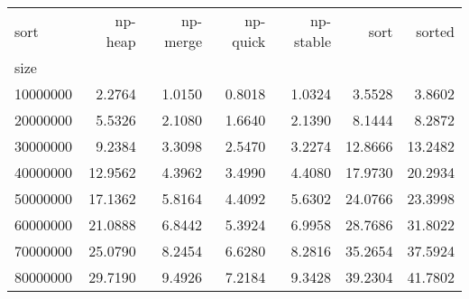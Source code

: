 \begin{tabular}{lrrrrrr}
\toprule
sort &  np-heap &  np-merge &  np-quick &  np-stable &     sort &   sorted \\
size     &          &           &           &            &          &          \\
\midrule
10000000 &   2.2764 &    1.0150 &    0.8018 &     1.0324 &   3.5528 &   3.8602 \\
20000000 &   5.5326 &    2.1080 &    1.6640 &     2.1390 &   8.1444 &   8.2872 \\
30000000 &   9.2384 &    3.3098 &    2.5470 &     3.2274 &  12.8666 &  13.2482 \\
40000000 &  12.9562 &    4.3962 &    3.4990 &     4.4080 &  17.9730 &  20.2934 \\
50000000 &  17.1362 &    5.8164 &    4.4092 &     5.6302 &  24.0766 &  23.3998 \\
60000000 &  21.0888 &    6.8442 &    5.3924 &     6.9958 &  28.7686 &  31.8022 \\
70000000 &  25.0790 &    8.2454 &    6.6280 &     8.2816 &  35.2654 &  37.5924 \\
80000000 &  29.7190 &    9.4926 &    7.2184 &     9.3428 &  39.2304 &  41.7802 \\
\bottomrule
\end{tabular}
